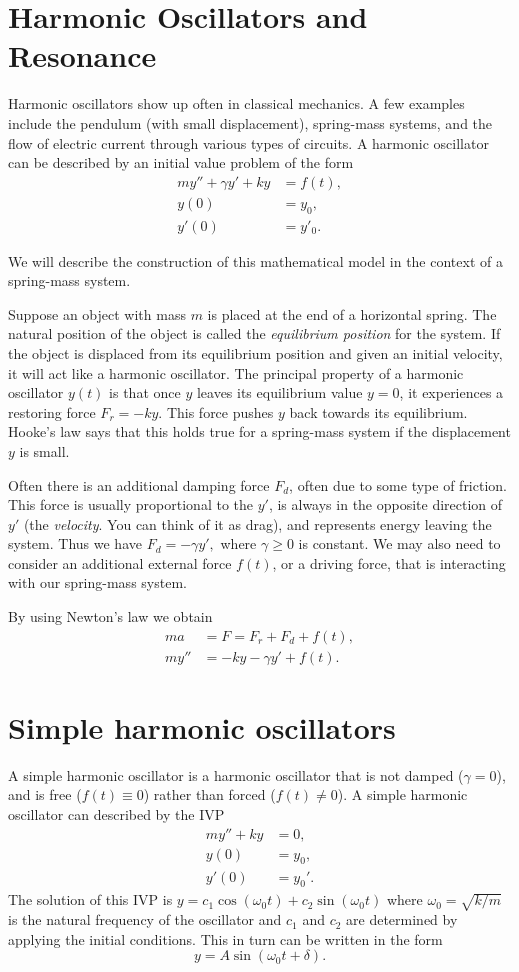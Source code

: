 \section*{Harmonic Oscillators and Resonance} Harmonic oscillators show up often in classical mechanics. 
A few examples include the pendulum (with small 
 displacement), spring-mass systems, and the flow of electric current through various types of circuits. 
A harmonic oscillator can be described by an initial value problem of the form 
\begin{align*}
	my'' + \gamma y' + ky &= f(t) ,\\
	y(0) &= y_0,\\
	y'(0) &= y'_0.
\end{align*}

We will describe the construction of this mathematical model in the context of a spring-mass system.

Suppose an object with mass $m$ is placed at the end of a horizontal spring. 
The natural position of the object is called the \textit{equilibrium position} for the system.
If the object is displaced from its equilibrium position and given an initial velocity,  
it will act like a harmonic oscillator.
The principal property of a harmonic oscillator $y(t)$ is that once $y$ leaves its equilibrium value $y = 0$, it experiences a restoring force $F_r = -ky.$ 
This force pushes $y$ back towards its equilibrium. 
Hooke's law says that this holds true for a 
spring-mass system if the displacement $y$ is small.

Often there is an additional damping force $F_d$, often due to some type of friction. This force is usually proportional to the $y'$, is always in the opposite direction of $y'$ (the \emph{velocity}. You can think of it as drag), and represents energy leaving the system. 
Thus we have $F_d = -\gamma y', $ where $ \gamma \geq 0$ is constant. 
We may also need to consider an additional external force $f(t)$, or a driving force, that is interacting with our spring-mass system.

By using Newton's law we obtain
\begin{align*}
ma &= F = F_r + F_d + f(t),\\
my'' &= -ky -\gamma y' + f(t).
\end{align*}

\section*{Simple harmonic oscillators}
A simple harmonic oscillator is a harmonic oscillator that is not damped ($\gamma =0$), and is free ($f(t) \equiv 0$) rather than forced ($f(t) \not = 0$). A simple harmonic oscillator can described by the IVP
\begin{align*}
my'' + ky &= 0,\\
y(0) &= y_0,\\
y'(0) &= y_0'.
\end{align*} 
The solution of this IVP is $y = c_1\cos (\omega_0 t) + c_2 \sin (\omega_0 t)$ where $\omega_0 = \sqrt{k/m}$ is the natural frequency of the oscillator and $c_1$ and $c_2$ are determined by applying the initial conditions. This in turn can be written in the form 
\[y = A\sin (\omega_0 t + \delta) .\]

